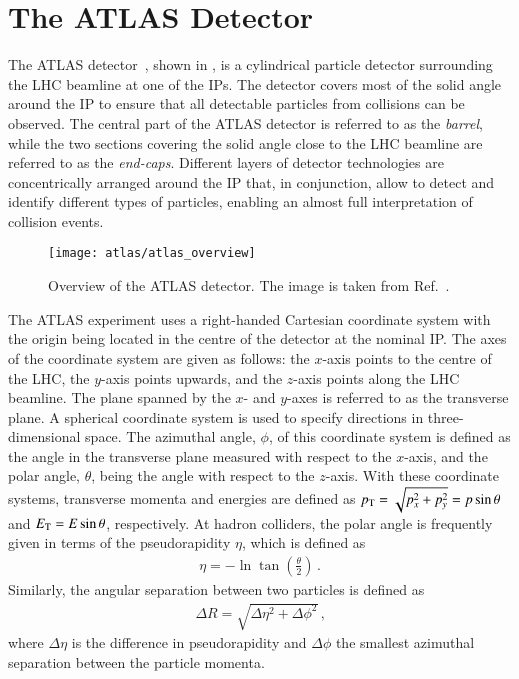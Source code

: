 \section{The ATLAS Detector}%
\label{sec:atlas}

The ATLAS detector~\cite{PERF-2007-01}, shown in
, is a cylindrical particle detector
surrounding the LHC beamline at one of the IPs. The detector covers most of the
solid angle around the IP to ensure that all detectable particles from
collisions can be observed. The central part of the ATLAS detector is referred
to as the \emph{barrel}, while the two sections covering the solid angle close
to the LHC beamline are referred to as the \emph{end-caps}. Different layers of
detector technologies are concentrically arranged around the IP that, in
conjunction, allow to detect and identify different types of particles, enabling
an almost full interpretation of collision events.

\begin{figure}[htbp]
  \centering

  \texttt{[image: atlas/atlas\_overview]}

  \caption{Overview of the ATLAS detector. The image is taken from
    Ref.~\cite{PERF-2007-01}.}%
  \label{fig:atlas_detector_overview}
\end{figure}

The ATLAS experiment uses a right-handed Cartesian coordinate system with the
origin being located in the centre of the detector at the nominal IP. The axes
of the coordinate system are given as follows: the $x$-axis points to the centre
of the LHC, the $y$-axis points upwards, and the $z$-axis points along the LHC
beamline. The plane spanned by the $x$- and $y$-axes is referred to as the
transverse plane. A spherical coordinate system is used to specify directions in
three-dimensional space. The azimuthal angle, $\phi$, of this coordinate system
is defined as the angle in the transverse plane measured with respect to the
$x$-axis, and the polar angle, $\theta$, being the angle with respect to the
$z$-axis. With these coordinate systems, transverse momenta and energies are
defined as $p_{\text{T}} = \sqrt{p_x^2 + p_y^2} = p \sin\theta$ and $E_{\text{T}} = E \sin\theta$,
respectively. At hadron colliders, the polar angle is frequently given in terms
of the pseudorapidity $\eta$, which is defined as
\begin{align*}
  \eta = - \ln\tan\left( \frac{\theta}{2} \right) \,\text{.}
\end{align*}
Similarly, the angular separation between two particles is defined as
\begin{align*}
  \Delta R = \sqrt{\Delta \eta^2 + \Delta \phi^2} \,\text{,}
\end{align*}
where $\Delta \eta$ is the difference in pseudorapidity and $\Delta \phi$ the
smallest azimuthal separation between the particle momenta.

